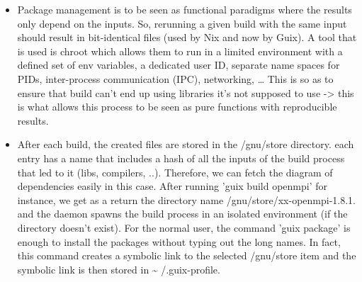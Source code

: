 \documentclass[11pt]{article}
\begin{document}
\begin{itemize}
\item Package management is to be seen as functional paradigms where the
results only depend on the inputs. So, rerunning a given build
with the same input should result in bit-identical files (used
by Nix and now by Guix). A tool that is used is chroot which
allows them to run in a limited environment with a defined set
of env variables, a dedicated user ID, separate name spaces for
PIDs, inter-process communication (IPC), networking, \ldots{} This is
so as to ensure that build can't end up using libraries it's not
supposed to use -> this is what allows this process to be seen as
pure functions with reproducible results.
\item After each build, the created files are stored in the /gnu/store
directory. each entry has a name that includes a hash of all the
inputs of the build process that led to it (libs, compilers, ..).
Therefore, we can fetch the diagram of dependencies easily in this
case. After running 'guix build openmpi' for instance, we get as a
return the directory name /gnu/store/xx-openmpi-1.8.1. and the
daemon spawns the build process in an isolated environment (if
the directory doesn't exist). For the normal user, the command
'guix package' is enough to install the packages without  typing
out the long names. In fact, this command creates a symbolic link
to the selected /gnu/store item and the symbolic link is then
stored in  \textasciitilde{} /.guix-profile.
\end{itemize}
\end{document}
